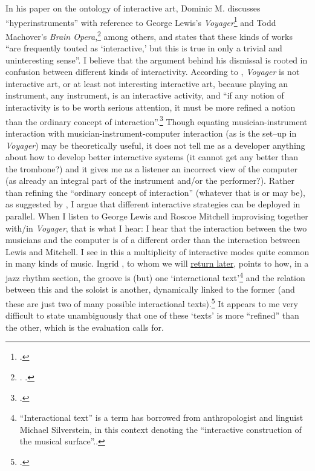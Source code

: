 \label{sec:inter-defin-2}
In his paper on the ontology of interactive art, Dominic M. \citeauthor{lopes01} discusses ``hyperinstruments'' with reference to George Lewis's \emph{Voyager}\footcite{lewis92} and Todd Machover's \emph{Brain Opera},\footnote{\cite[See][]{paradiso99}. \cite[See also][360-2]{rowe01}.} among others, and states that these kinds of works ``are frequently touted as `interactive,' but this is true in only a trivial and uninteresting sense''. I believe that the argument behind his dismissal is rooted in confusion between different kinds of interactivity. According to \citeauthor{lopes01}, \emph{Voyager} is not interactive art, or at least not interesting interactive art, because playing an instrument, any instrument, is an interactive activity, and ``if any notion of interactivity is to be worth serious attention, it must be more refined a notion than the ordinary concept of interaction''.\footcite[67]{lopes01} Though equating musician-instrument interaction with musician-instrument-computer interaction (as is the set--up in \emph{Voyager}) may be theoretically useful, it does not tell me as a developer anything about how to develop better interactive systems (it cannot get any better than the trombone?) and it gives me as a listener an incorrect view of the computer (as already an integral part of the instrument and/or the performer?). Rather than refining the ``ordinary concept of interaction'' (whatever that is or may be), as suggested by \citeauthor{lopes01}, I argue that different interactive strategies can be deployed in parallel. When I listen to George Lewis and Roscoe Mitchell improvising together with/in \emph{Voyager}, that is what I hear: I hear that the interaction between the two musicians and the computer is of a different order than the interaction between Lewis and Mitchell. I see in this a multiplicity of interactive modes quite common in many kinds of music. \hypertarget{sec:inter-defin:monson}{Ingrid} \citeauthor{monson96}, to whom we will \hyperref[sec:mult-music-inter]{return later}, points to how, in a jazz rhythm section, the groove is (but) one `interactional text'\footnote{``Interactional text'' is a term \citeauthor{monson96} has borrowed from anthropologist and linguist Michael Silverstein, in this context denoting the ``interactive construction of the musical surface''.\cite[189]{monson96}.} and the relation between this and the soloist is another, dynamically linked to the former (and these are just two of many possible interactional texts).\footcite[188]{monson96} It appears to me very difficult to state unambiguously that one of these `texts' is more ``refined'' than the other, which is the evaluation \citeauthor{lopes01} calls for. 

